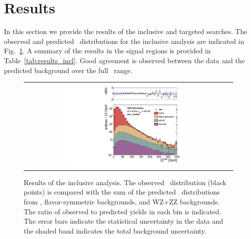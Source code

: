 \clearpage

\section{Results}

In this section we provide the results of the inclusive and targeted searches. 
The observed and predicted \MET\ distributions for the inclusive analysis are indicated in Fig.~\ref{fig:results_incl}. 
A summary of the results in the signal regions is provided in Table~\ref{tab:results_incl}. 
Good agreement is observed between the data and the predicted background over the full \MET\ range.

\begin{figure}[!h]
\begin{center}
\begin{tabular}{cc}
\includegraphics[width=0.6\textwidth]{plots/pfmet_all_19fb.pdf}
\end{tabular}
\caption{Results of the inclusive analysis. The observed \MET\ distribution (black points) is compared with the sum of the predicted \MET\
distributions from \zjets, flavor-symmetric backgrounds, and WZ+ZZ backgrounds. The ratio of observed to predicted yields in each bin is
indicated. The error bars indicate the statistical uncertainty in the data and the shaded band indicates the total background uncertainty.
\label{fig:results_incl}
}
\end{center}
\end{figure}




